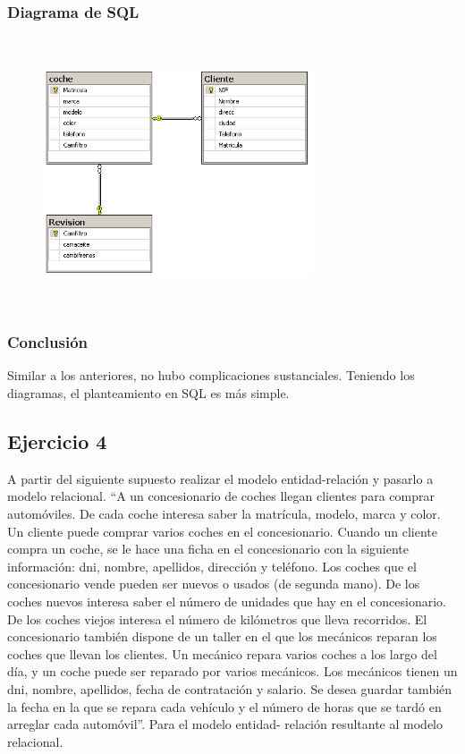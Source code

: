 \documentclass[a4paper, 12pt]{article}
\begin{document}
\begin{justify}
        \subsubsection{Diagrama de SQL}
        \begin{figure}[H]
            \centering
            \includegraphics[width=8cm,height=8cm]{sql3.PNG}
        \end{figure}
        \subsubsection{Conclusión}
        \justify
        Similar a los anteriores, no hubo complicaciones sustanciales. Teniendo los diagramas, el planteamiento en SQL es más simple.
        \subsection{Ejercicio 4}
        \justify
        A partir del siguiente supuesto realizar el modelo entidad-relación y pasarlo a modelo relacional. ``A un concesionario de coches llegan clientes para comprar automóviles. De cada coche
        interesa saber la matrícula, modelo, marca y color. Un cliente puede comprar varios coches en el concesionario. Cuando un cliente compra un coche, se le hace una ficha en el concesionario
        con la siguiente información: dni, nombre, apellidos, dirección y teléfono. Los coches que el concesionario vende pueden ser nuevos o usados (de segunda mano). De los coches nuevos interesa
        saber el número de unidades que hay en el concesionario. De los coches viejos interesa el número de kilómetros que lleva recorridos. El concesionario también dispone de un taller en el que los
        mecánicos reparan los coches que llevan los clientes. Un mecánico repara varios coches a los largo del día, y un coche puede ser reparado por varios mecánicos. Los mecánicos tienen un dni, nombre, 
        apellidos, fecha de contratación y salario. Se desea guardar también la fecha en la que se repara cada vehículo y el número de horas que se tardó en arreglar cada automóvil''. Para el modelo entidad-
        relación resultante al modelo relacional.

\end{justify}
\end{document}
